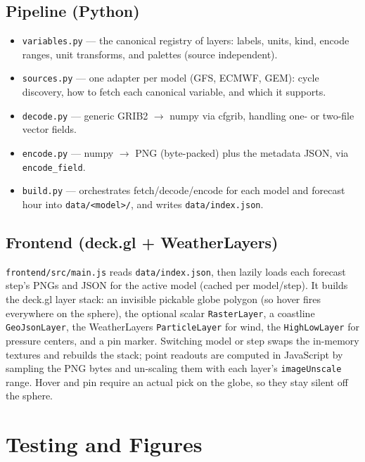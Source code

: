\documentclass[11pt,letterpaper]{article}
\begin{document}
\subsection{Pipeline (Python)}
\begin{itemize}
  \item \texttt{variables.py} --- the canonical registry of layers: labels,
        units, kind, encode ranges, unit transforms, and palettes (source
        independent).
  \item \texttt{sources.py} --- one adapter per model (GFS, ECMWF, GEM): cycle
        discovery, how to fetch each canonical variable, and which it supports.
  \item \texttt{decode.py} --- generic GRIB2 $\rightarrow$ numpy via cfgrib,
        handling one- or two-file vector fields.
  \item \texttt{encode.py} --- numpy $\rightarrow$ PNG (byte-packed) plus the
        metadata JSON, via \texttt{encode\_field}.
  \item \texttt{build.py} --- orchestrates fetch/decode/encode for each model and
        forecast hour into \texttt{data/<model>/}, and writes
        \texttt{data/index.json}.
\end{itemize}

\subsection{Frontend (deck.gl + WeatherLayers)}
\texttt{frontend/src/main.js} reads \texttt{data/index.json}, then lazily loads
each forecast step's PNGs and JSON for the active model (cached per
model/step). It builds the deck.gl layer stack: an invisible pickable globe
polygon (so hover fires everywhere on the sphere), the optional scalar
\texttt{RasterLayer}, a coastline \texttt{GeoJsonLayer}, the WeatherLayers
\texttt{ParticleLayer} for wind, the \texttt{HighLowLayer} for pressure centers,
and a pin marker. Switching model or step swaps the in-memory textures and
rebuilds the stack; point readouts are computed in JavaScript by sampling the PNG
bytes and un-scaling them with each layer's \texttt{imageUnscale} range. Hover
and pin require an actual pick on the globe, so they stay silent off the sphere.

\section{Testing and Figures}
\end{document}
